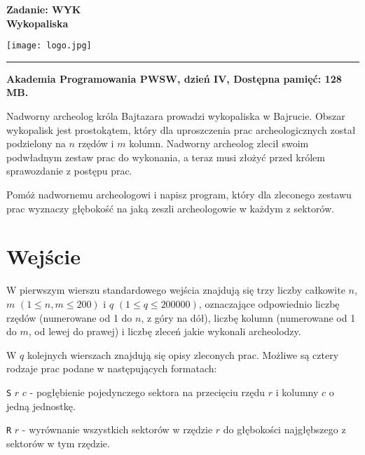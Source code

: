\documentclass[10pt]{article}
\begin{document}
    

    \noindent
    \begin{minipage}{0.5\textwidth}
        \LARGE{\textsf{\textbf{Zadanie: WYK\\Wykopaliska}}}
    \end{minipage}
    \begin{minipage}{0.5\textwidth}
        \begin{flushright}
            \texttt{[image: logo.jpg]}
        \end{flushright}
    \end{minipage}
    
    \noindent\rule{\textwidth}{0.4pt}
    
    \noindent\textbf{Akademia Programowania PWSW, dzień IV, Dostępna pamięć: 128 MB.}
    \vspace{1em}
    
    
    \noindent
    Nadworny archeolog króla Bajtazara prowadzi wykopaliska w Bajrucie. Obszar wykopalisk jest prostokątem, który dla uproszczenia prac archeologicznych został podzielony na $n$ rzędów i $m$ kolumn. Nadworny archeolog zlecił swoim podwładnym zestaw prac do wykonania, a teraz musi złożyć przed królem sprawozdanie z postępu prac.
    
    Pomóż nadwornemu archeologowi i napisz program, który dla zleconego zestawu prac wyznaczy głębokość na jaką zeszli archeologowie w każdym z sektorów.


    \section*{Wejście}
    
    W pierwszym wierszu standardowego wejścia znajdują się trzy liczby całkowite $n$, $m$ $(1\leq n, m\leq 200)$ i $q$ $(1\leq q\leq 200000)$, oznaczające odpowiednio liczbę rzędów (numerowane od 1 do $n$, z góry na dół), liczbę kolumn (numerowane od 1 do $m$, od lewej do prawej) i liczbę zleceń jakie wykonali archeolodzy.

    W $q$ kolejnych wierszach znajdują się opisy zleconych prac. Możliwe są cztery rodzaje prac podane w następujących formatach:

    \texttt{S} $r$ $c$ - pogłębienie pojedynczego sektora na przecięciu rzędu $r$ i kolumny $c$ o jedną jednostkę. 

    \texttt{R} $r$ - wyrównanie wszystkich sektorów w rzędzie $r$ do głębokości najgłębszego z sektorów w tym rzędzie. 
\end{document}
